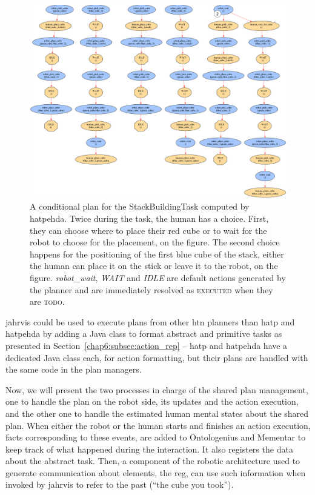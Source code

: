 \documentclass[a4paper,11pt,twoside]{StyleThese}
\begin{document}
\begin{landscape}
	\thispagestyle{example}
	\begin{figure}[!hp]
		\centering
		\includegraphics[scale=0.31]{figures/chapter2/plan_building2.png}
		\caption{A conditional plan for the StackBuildingTask computed by \acrshort{hatpehda}. Twice during the task, the human has a choice. First, they can choose where to place their red cube or to wait for the robot to choose for the placement,  on the figure. The second choice happens for the positioning of the first blue cube of the stack, either the human can place it on the stick or leave it to the robot,  on the figure. \textit{robot\_wait}, \textit{WAIT} and \textit{IDLE} are default actions generated by the planner and are immediately resolved as \textsc{executed} when they are \textsc{todo}. }
		\label{chap6:fig:plan_building2}
	\end{figure}
\end{landscape}
\restoregeometry

\bigskip
\acrshort{jahrvis} could be used to execute plans from other \acrshort{htn} planners than \acrshort{hatp} and \acrshort{hatpehda} by adding a Java class to format abstract and primitive tasks as presented in Section~\ref{chap6:subsec:action_rep} -- \acrshort{hatp} and \acrshort{hatpehda} have a dedicated Java class each, for action formatting, but their plans are handled with the same code in the plan managers.

Now, we will present the two processes in charge of the shared plan management, one to handle the plan on the robot side, \ie its updates and the action execution, and the other one to handle the estimated human mental states about the shared plan. When either the robot or the human starts and finishes an action execution, facts corresponding to these events, are added to Ontologenius and Mementar to keep track of what happened during the interaction. It also registers the data about the abstract task. Then, a component of the robotic architecture used to generate communication about elements, the \acrfull{reg}, can use such information when invoked by \acrshort{jahrvis} to refer to the past (\eg ``the cube you took'').
\end{document}
